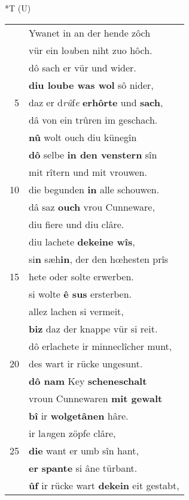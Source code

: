 \documentclass[8pt,a4paper,notitlepage]{article}
\begin{document}
\begin{table}[ht]
\begin{minipage}[t]{0.5\linewidth}
\end{minipage}
\hspace{0.5cm}
\begin{minipage}[t]{0.5\linewidth}
\small
\begin{center}*T (U)
\end{center}
\begin{tabular}{rl}
 & Ywanet in an der hende zôch\\ 
 & vür ein lo\textit{u}ben niht zuo hôch.\\ 
 & dô sach er vür und wider.\\ 
 & \textbf{diu loube was wol} sô nider,\\ 
5 & daz er d\textit{rû}f\textit{e} \textbf{erhôrte} und \textbf{sach},\\ 
 & dâ von ein trûren im geschach.\\ 
 & \textbf{nû} wolt ouch diu künegîn\\ 
 & \textbf{dô} selbe \textbf{in den venstern} sîn\\ 
 & mit rîtern und mit vrouwen.\\ 
10 & die begunden \textbf{in} alle schouwen.\\ 
 & dâ saz \textbf{ouch} vrou Cunneware,\\ 
 & diu fiere und diu clâre.\\ 
 & diu lachete \textbf{dekeine wîs},\\ 
 & si\textbf{n} sæh\textbf{in}, der den hœhesten prîs\\ 
15 & hete oder solte erwerben.\\ 
 & si wolte \textbf{ê sus} ersterben.\\ 
 & allez lachen si vermeit,\\ 
 & \textbf{biz} daz der knappe vür si reit.\\ 
 & dô erlachete ir minneclîcher munt,\\ 
20 & des wart ir rücke ungesunt.\\ 
 & \textbf{dô nam} Key \textbf{scheneschalt}\\ 
 & vroun Cunnewaren \textbf{mit gewalt}\\ 
 & \textbf{bî} ir \textbf{wolgetânen} hâre.\\ 
 & ir la\textit{n}gen zöpfe clâre,\\ 
25 & \textbf{die} want er umb sîn hant,\\ 
 & \textbf{er} \textbf{spante} si âne türbant.\\ 
 & \textbf{ûf} ir rücke wart \textbf{dekein} eit gestabt,\\ 

\end{tabular}
\end{minipage}
\end{table}
\end{document}
